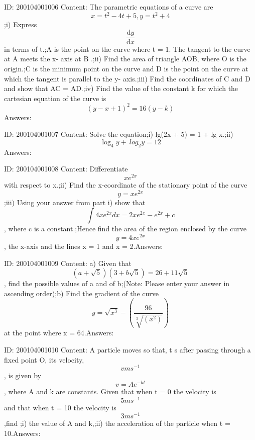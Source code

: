 \documentclass{article}
\begin{document}
ID: 200104001006
Content:
The parametric equations of a curve are $$x=t^2-4t+5, y=t^2+4$$;i) Express $$\frac{\mathrm{d} y}{\mathrm{d} x}$$ in terms of t.;A is the point on the curve where t = 1. The tangent to the curve at A meets the x- axis at B .;ii) Find the area of triangle AOB, where O is the origin.;C is the minimum point on the curve and D is the point on the curve at which the tangent is parallel to the y- axis.;iii) Find the coordinates of C and D and show that AC = AD.;iv) Find the value of the constant k for which the cartesian equation of the curve is $$(y-x+1)^2=16(y-k)$$Answers:

ID: 200104001007
Content:
Solve the equation;i) lg(2x + 5) = 1 + lg x.;ii) $$\log_4y +\ log_2y=12$$Answers:

ID: 200104001008
Content:
Differentiate $$xe^{2x}$$ with respect to x.;ii) Find the x-coordinate of the stationary point of the curve $$y=xe^{2x}$$;iii) Using your answer from part i) show that $$\int4xe^{2x}dx=2xe^{2x}-e^{2x}+c$$, where c is a constant.;Hence find the area of the region enclosed by the curve $$y=4xe^{2x}$$, the x-axis and the lines x = 1 and x = 2.Answers:

ID: 200104001009
Content:
a) Given that $$(a+\sqrt5)(3+b\sqrt5)=26+11\sqrt5$$, find the possible values of a and of b;(Note: Please enter your answer in ascending order);b) Find the gradient of the curve $$y=\sqrt{x^3}-(\frac{96}{\sqrt[3]{(x^2)}})$$ at the point where x = 64.Answers:

ID: 200104001010
Content:
A particle moves so that, t s after passing through a fixed point O, its velocity, $$vms^{-1}$$, is given by $$v=Ae^{-kt}$$, where A and k are constants. Given that when t = 0 the velocity is $$5 ms^{-1}$$ and that when t = 10 the velocity is $$3ms^{-1}$$,find ;i) the value of A and k,;ii) the acceleration of the particle when t = 10.Answers:
\end{document}
